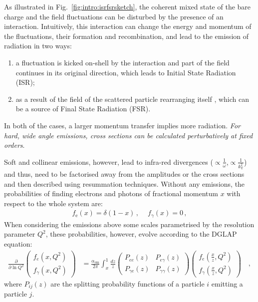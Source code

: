 As illustrated in Fig.~\ref{fig:intro:isrfsrsketch}, the coherent mixed state of the bare charge and the field fluctuations can be disturbed by the presence of an interaction. Intuitively, this interaction can change the energy and momentum of the fluctuations, their formation and recombination, and lead to the emission of radiation in two ways:
\begin{enumerate}
\item a fluctuation is kicked on-shell by the interaction and part of the field continues in its original direction, which leads to Initial State Radiation (ISR);
\item as a result of the field of the scattered particle rearranging itself , which can be a source of Final State Radiation (FSR).
\end{enumerate}

In both of the cases, a larger momentum transfer implies more radiation. \textit{For hard, wide angle emissions, cross sections can be calculated perturbatively at fixed orders}. 

Soft and collinear emissions, however, lead to infra-red divergences ($\propto \frac{1}{\omega}$,$\propto \frac{1}{k_\mathrm{T}^2}$) and thus, need to be factorised away from the amplitudes or the cross sections and then described using resummation techniques. Without any emissions, the probabilities of finding electrons and photons of fractional momentum $x$ with respect to the whole system are:
\begin{align}
f_\mathrm{e} (x) = \delta (1-x) \, , \quad \ f_\gamma(x) = 0 \, ,
\end{align}
When considering the emissions above some scales parametrised by the resolution parameter $Q^2$, these probabilities, however, evolve according to the DGLAP equation:
\begin{align}
\label{eq:intro:dglap}
\frac{\partial}{\partial\ln Q^2}
\begin{pmatrix}
f_e(x, Q^2)\\
f_{\gamma}(x, Q^2)
\end{pmatrix}
&= \frac{\alpha_\mathrm{em}}{2\pi}
\int_x^1 \frac{dz}{z}
\begin{pmatrix}
P_{ee}(z) & P_{e\gamma}(z)\\
P_{\gamma e}(z) & P_{\gamma\gamma}(z)
\end{pmatrix}
\begin{pmatrix}
f_e\left(\frac{x}{z}, Q^2\right)\\
f_{\gamma}\left(\frac{x}{z}, Q^2\right)
\end{pmatrix} \quad ,
\end{align}
where $P_{ij}(z)$ are the splitting probability functions of a particle $i$ emitting a particle $j$.

